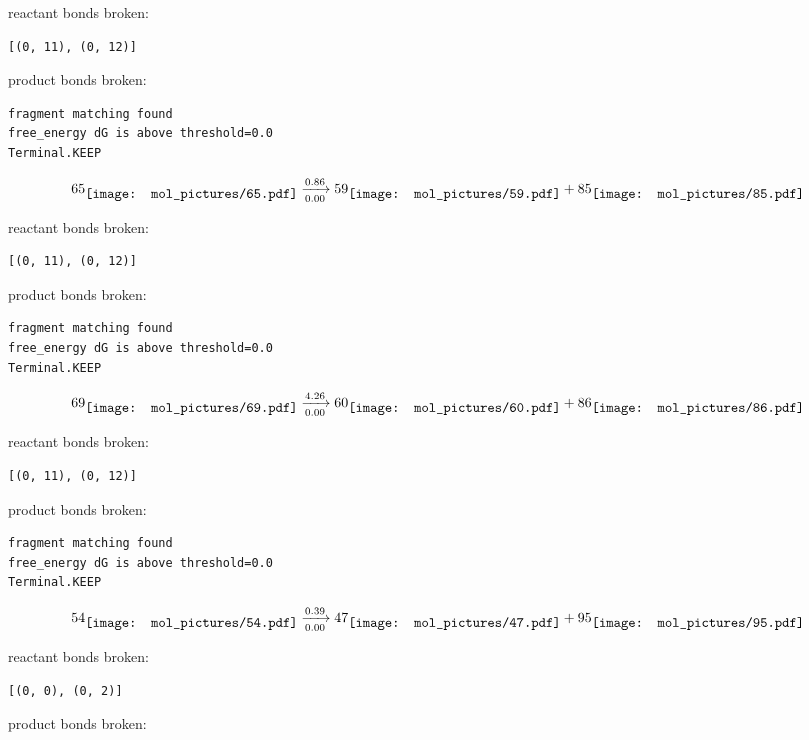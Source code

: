 \documentclass{article}
\begin{document}
reactant bonds broken:\begin{verbatim}
[(0, 11), (0, 12)]
\end{verbatim}
product bonds broken:



\vspace{1cm}
\begin{verbatim}
fragment matching found
free_energy dG is above threshold=0.0
Terminal.KEEP
\end{verbatim}
$$
65
\raisebox{-.5\height}{\texttt{[image: mol\_pictures/65.pdf]}}
\xrightarrow[0.00]{0.86}
59
\raisebox{-.5\height}{\texttt{[image: mol\_pictures/59.pdf]}}
+
85
\raisebox{-.5\height}{\texttt{[image: mol\_pictures/85.pdf]}}
$$


reactant bonds broken:\begin{verbatim}
[(0, 11), (0, 12)]
\end{verbatim}
product bonds broken:



\vspace{1cm}
\begin{verbatim}
fragment matching found
free_energy dG is above threshold=0.0
Terminal.KEEP
\end{verbatim}
$$
69
\raisebox{-.5\height}{\texttt{[image: mol\_pictures/69.pdf]}}
\xrightarrow[0.00]{4.26}
60
\raisebox{-.5\height}{\texttt{[image: mol\_pictures/60.pdf]}}
+
86
\raisebox{-.5\height}{\texttt{[image: mol\_pictures/86.pdf]}}
$$


reactant bonds broken:\begin{verbatim}
[(0, 11), (0, 12)]
\end{verbatim}
product bonds broken:



\vspace{1cm}
\begin{verbatim}
fragment matching found
free_energy dG is above threshold=0.0
Terminal.KEEP
\end{verbatim}
$$
54
\raisebox{-.5\height}{\texttt{[image: mol\_pictures/54.pdf]}}
\xrightarrow[0.00]{0.39}
47
\raisebox{-.5\height}{\texttt{[image: mol\_pictures/47.pdf]}}
+
95
\raisebox{-.5\height}{\texttt{[image: mol\_pictures/95.pdf]}}
$$


reactant bonds broken:\begin{verbatim}
[(0, 0), (0, 2)]
\end{verbatim}
product bonds broken:
\end{document}

